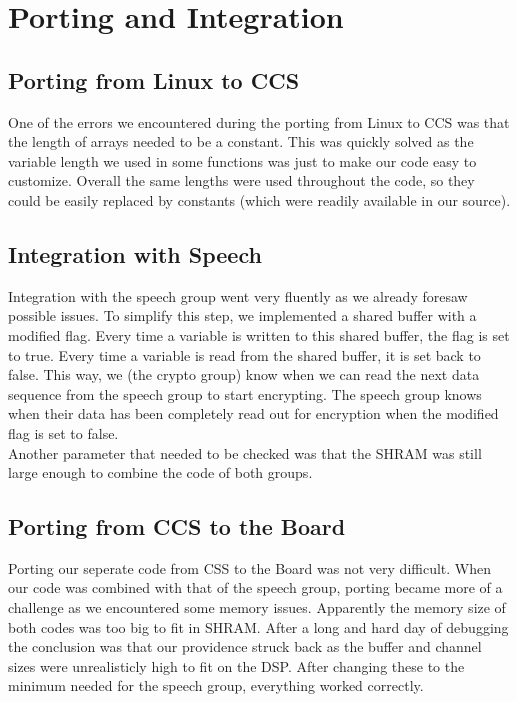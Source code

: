 \documentclass[a4paper]{article}
\begin{document}
\section{Porting and Integration}

\subsection{Porting from Linux to CCS}

One of the errors we encountered during the porting from Linux to CCS was that the length of arrays needed to be a constant. This was quickly solved as the variable length we used in some functions was just to make our code easy to customize. Overall the same lengths were used throughout the code, so they could be easily replaced by constants (which were readily available in our source).

\subsection{Integration with Speech}

Integration with the speech group went very fluently as we already foresaw possible issues. To simplify this step, we implemented a shared buffer with a modified flag. Every time a variable is written to this shared buffer, the flag is set to true. Every time a variable is read from the shared buffer, it is set back to false. This way, we (the crypto group) know when we can read the next data sequence from the speech group to start encrypting. The speech group knows when their data has been completely read out for encryption when the modified flag is set to false.\\

Another parameter that needed to be checked was that the SHRAM was still large enough to combine the code of both groups.

\subsection{Porting from CCS to the Board}

Porting our seperate code from CSS to the Board was not very difficult. When our code was combined with that of the speech group, porting became more of a challenge as we encountered some memory issues. Apparently the memory size of both codes was too big to fit in SHRAM. After a long and hard day of debugging the conclusion was that our providence struck back as the buffer and channel sizes were unrealisticly high to fit on the DSP. After changing these to the minimum needed for the speech group, everything worked correctly.
\end{document}
